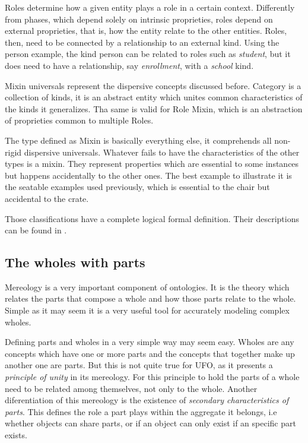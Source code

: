 Roles determine how a given entity plays a role in a certain context. Differently from phases, which depend solely on intrinsic proprieties, roles depend on external proprieties, that is, how the entity relate to the other entities. Roles, then, need to be connected by a relationship to an external  kind. Using the person example, the kind person can be related to roles such as \textit{student}, but it does need to have a relationship, say \textit{enrollment}, with a \textit{school} kind. 

Mixin universals represent the dispersive concepts discussed before. Category is a collection of kinds, it is an abstract entity which unites common characteristics of the kinds it generalizes. Tha same is valid for Role Mixin, which is an abstraction of proprieties common to multiple Roles. 

The type defined as Mixin is basically everything else, it comprehends all non-rigid dispersive universals. Whatever fails to have the characteristics of the other types is a mixin. They represent properties which are essential to some instances but happens accidentally to the other ones. The best example to illustrate it is the seatable examples used previously, which is essential to the chair but accidental to the crate.

Those classifications have a complete logical formal definition. Their descriptions can be found in \cite{guizzardi_ontological_2005}.

\subsection{The wholes with parts}

Mereology is a very important component of ontologies. It is the theory which relates the parts that compose a whole and how those parts relate to the whole. Simple as it may seem it is a very useful tool for accurately modeling complex wholes.

Defining parts and wholes in a very simple way may seem easy. Wholes are any concepts which have one or more parts and the concepts that together make up another one are parts. But this is not quite true for UFO, as it presents a \textit{principle of unity} in its mereology. For this principle to hold the parts of a whole need to be related among themselves, not only to the whole. Another diferentiation of this mereology is the existence of \textit{secondary characteristics of parts}. This defines the role a part plays within the aggregate it belongs, i.e whether objects can share parts, or if an object can only exist if an specific part exists. 

